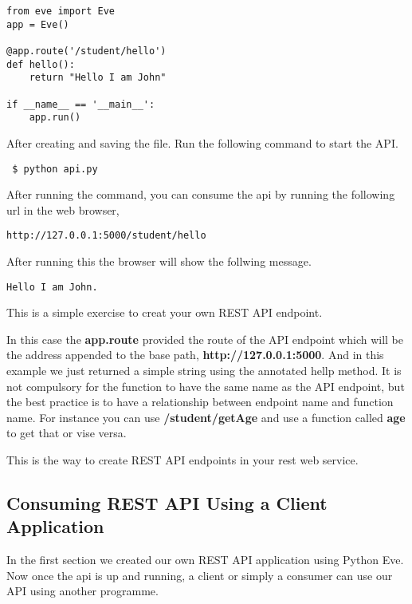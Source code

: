 \begin{lstlisting}
from eve import Eve
app = Eve()

@app.route('/student/hello')
def hello():
    return "Hello I am John"

if __name__ == '__main__':
    app.run()

\end{lstlisting}

After creating and saving the file. Run the following command to start
the API.


\begin{lstlisting}
 $ python api.py
\end{lstlisting}

After running the command, you can consume the api by running the following
url in the web browser,

\begin{lstlisting}
http://127.0.0.1:5000/student/hello
\end{lstlisting}

After running this the browser will show the follwing message.

\begin{lstlisting}
Hello I am John.
\end{lstlisting}

This is a simple exercise to creat your own REST API endpoint.

In this case the \textbf{app.route} provided the route of the API endpoint
which will be the address appended to the base path, \textbf{http://127.0.0.1:5000}. And in this example we just returned a simple string using the annotated hellp method. It is not compulsory for the function to have the same name as the API endpoint, but the best practice is to have a relationship between endpoint name and function name. For instance you can use \textbf{/student/getAge} and use a function called \textbf{age} to get that or vise versa.

This is the way to create REST API endpoints in your rest web service. 

\clearpage

\subsection{Consuming REST API Using a Client Application}

In the first section we created our own REST API application using
Python Eve. Now once the api is up and running, a client or simply a
consumer can use our API using another programme.

